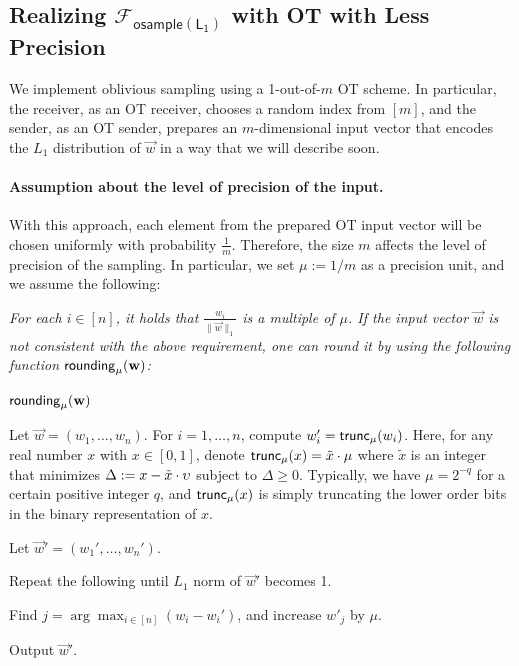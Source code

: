 \subsection{Realizing $\mathcal{F}_{\mathsf{osample(L_1)}}$ with OT with Less Precision}
\label{apx:otl1}
We implement oblivious sampling using a 1-out-of-$m$ OT scheme. In
particular, the receiver, as an OT receiver, chooses a random index from
$[m]$, and the sender, as an OT sender, prepares an $m$-dimensional
input vector that encodes the $L_1$ distribution of $\vec{w}$ in a way
that we will describe soon.

\paragraph{Assumption about the level of precision of the input.} 
With this approach, each element from the prepared OT input vector will
be chosen uniformly with probability $\frac 1 m$. Therefore, the size
$m$ affects the level of precision of the sampling.
%
In particular, we set $\mu := 1/m$ as a precision unit, and we assume
the following:

\BI
\item[]
  \it For each $i \in [n]$, it holds that $\frac{w_{i}}{\|\vec{w}\|_1}$ is a multiple of $\mu$.
\EI
%
If the input vector $\vec w$ is not consistent with the above
requirement, one can round it by using the following function
${\mathsf{rounding}}_{\mu}(\mathbf{w})$: 

\BEN
\item[] \hspace{-2em} ${\mathsf{rounding}}_\mu(\mathbf{w})$
\item Let $\vec{w} = (w_1, \ldots, w_n)$.  For $i = 1, \ldots, n$,
compute $w_i' = {\mathsf{trunc}}_{\mu}(w_i)$. Here, for any real number $x$ with $x \in [0,1]$, denote ${\mathsf{trunc}}_{\mu}(x) =
\tilde x \cdot \mu$ where $\tilde x$ is an integer that minimizes $\Delta
:= x - \tilde x \cdot \upsilon$ subject to $\Delta \ge 0$. 
Typically, we have $\mu = 2^{-q}$
for a certain positive integer $q$, and ${\mathsf{trunc}}_{\mu}(x)$ is simply
truncating the lower order bits in the binary representation of $x$. 



Let $\vec{w}' = (w_1', \ldots,
w_n')$. 

\item Repeat the following until $L_1$ norm of $\vec{w}'$ becomes 1. 
    \BI
    \item[] Find $j = \arg\max_{i \in [n]} (w_i - w_i')$, and increase
    $w'_j$ by $\mu$.
    \EI
\item Output $\vec{w}'$. 
\EEN

